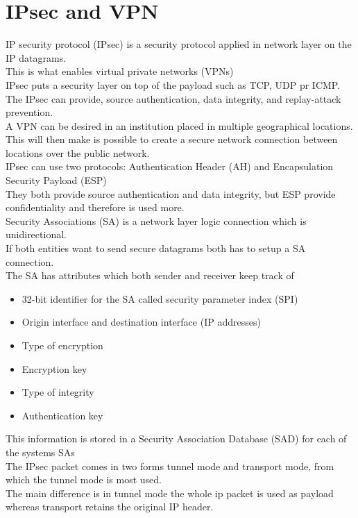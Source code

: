 \documentclass[12pt, a4paper]{article}
\begin{document}
	\section{IPsec and VPN}
		IP security protocol (IPsec) is a security protocol applied in network layer on the IP datagrams.\\
		This is what enables virtual private networks (VPNs)\\
		IPsec puts a security layer on top of the payload such as TCP, UDP pr ICMP.\\
		The IPsec can provide, source authentication, data integrity, and replay-attack prevention.\\
		A VPN can be desired in an institution placed in multiple geographical locations.\\
		This will then make is possible to create a secure network connection between locations over the public network.\\
		IPsec can use two protocols: Authentication Header (AH) and Encapsulation Security Payload (ESP)\\
		They both provide source authentication and data integrity, but ESP provide confidentiality and therefore is used more.\\
		Security Associations (SA) is a network layer logic connection which is unidirectional.\\
		If both entities want to send secure datagrams both has to setup a SA connection.\\
		The SA has attributes which both sender and receiver keep track of
		\begin{itemize}
			\item 32-bit identifier for the SA called security parameter index (SPI)
			\item Origin interface and destination interface (IP addresses)
			\item Type of encryption
			\item Encryption key
			\item Type of integrity
			\item Authentication key
		\end{itemize}
		This information is stored in a Security Association Database (SAD) for each of the systems SAs\\
		The IPsec packet comes in two forms tunnel mode and transport mode, from which the tunnel mode is most used.\\
		The main difference is in tunnel mode the whole ip packet is used as payload whereas transport retains the original IP header.\\
\end{document}
